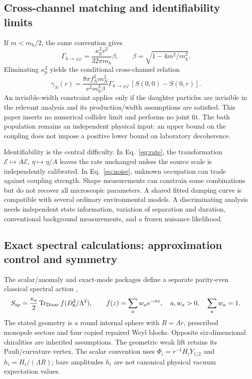 \subsection{Cross-channel matching and identifiability limits}
If $m<m_h/2$, the same convention gives
\begin{equation}
 \Gamma_{h\to\varphi\varphi}=\frac{\kappa_p^2v^2}{32\pi m_h}\beta,
 \qquad \beta=\sqrt{1-4m^2/m_h^2}.
\end{equation}
Eliminating $\kappa_p^2$ yields the conditional cross-channel relation
\begin{equation}
 \gamma_N(r)=\frac{8\pi f_N^2m_N^2}{v^2m_h^3\beta}
 \Gamma_{h\to\varphi\varphi}\,[S(0,0)-S(0,r)].
 \label{eq:cross}
\end{equation}
An invisible-width constraint applies only if the daughter particles are invisible in the relevant analysis and its production/width assumptions are satisfied. This paper inserts no numerical collider limit and performs no joint fit. The bath population remains an independent physical input: an upper bound on the coupling does not impose a positive lower bound on laboratory decoherence.

Identifiability is the central difficulty. In Eq.~\eqref{eq:rate}, the transformation $\mathcal E\mapsto A\mathcal E$, $\eta\mapsto\eta/A$ leaves the rate unchanged unless the source scale is independently calibrated. In Eq.~\eqref{eq:noise}, unknown occupation can trade against coupling strength. Shape measurements can constrain some combinations but do not recover all microscopic parameters. A shared fitted damping curve is compatible with several ordinary environmental models. A discriminating analysis needs independent state information, variation of separation and duration, conventional background measurements, and a frozen nuisance likelihood.

\subsection{Exact spectral calculations: approximation control and symmetry}
The scalar/anomaly and exact-mode packages define a separate parity-even classical spectral action \cite{scalar,exact},
\begin{equation}
 S_{\rm sp}=\frac{\kappa_s}{2}\operatorname{Tr}_{\rm Dirac}
 f(D_6^2/\Lambda^2),\qquad
 f(z)=\sum_a w_ae^{-az},\quad a,w_a>0,\quad\sum_aw_a=1.
\end{equation}
The stated geometry is a round internal sphere with $R=\Lambda r$, prescribed monopole sectors and four copied repaired Weyl blocks. Opposite six-dimensional chiralities are inherited assumptions. The geometric weak lift retains its Pauli/curvature vertex. The scalar convention uses $\Phi_i=r^{-1}H_iY_{1/2}$ and $h_i=H_i/(\Lambda R)$; bare amplitudes $h_i$ are not canonical physical vacuum expectation values.

